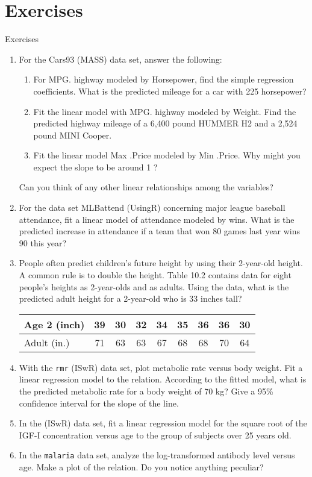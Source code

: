 \section{Exercises}

\begin{frame}[allowframebreaks]{Exercises}
  \begin{enumerate}
  \item  For the Cars93 (MASS) data set, answer the following:
    \begin{enumerate}
    \item For MPG. highway modeled by Horsepower, find the simple regression
coefficients. What is the predicted mileage for a car with 225 horsepower?
    \item Fit the linear model with MPG. highway modeled by Weight. Find the predicted highway mileage of a 6,400 pound HUMMER H2 and a 2,524 pound MINI Cooper.
    \item Fit the linear model Max .Price modeled by Min .Price. Why might you expect the slope to be around 1 ?
    \end{enumerate}
    Can you think of any other linear relationships among the variables?
  \item  For the data set MLBattend (UsingR) concerning major league baseball
attendance, fit a linear model of attendance modeled by wins. What is the predicted increase in attendance if a team that won 80 games last year wins 90 this year?
  \item  People often predict children’s future height by using their 2-year-old height. A common rule is to double the height. Table 10.2 contains data for eight people’s heights as 2-year-olds and as adults. Using the data, what is the predicted adult height for a 2-year-old who is 33 inches tall?

    \begin{tabular}{l c c c c c c c c}
      \hline
      Age 2 (inch) & 39 & 30 & 32 & 34 & 35 & 36 & 36 & 30 \\
      \hline
      Adult (in.) & 71 & 63 & 63 & 67 & 68 & 68 & 70 & 64 \\
      \hline
    \end{tabular}
  \item With the \texttt{rmr} (ISwR) data set, plot metabolic rate versus body weight. Fit a linear regression model to the relation. According to the fitted model, what is the predicted metabolic rate for a body weight of 70 kg? Give a
95\% confidence interval for the slope of the line.
  \item In the  (ISwR) data set, fit a linear regression model for the square root of the IGF-I concentration versus age to the group of subjects over 25 years old.
  \item In the \texttt{malaria} data set, analyze the log-transformed antibody level
versus age. Make a plot of the relation. Do you notice anything peculiar?
  \end{enumerate}
\end{frame}

